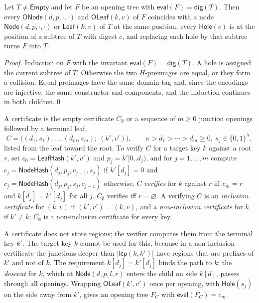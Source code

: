 \documentclass[runningheads]{llncs}
\newcommand{\LeafHash}{\mathsf{LeafHash}}
\newcommand{\NodeHash}{\mathsf{NodeHash}}
\newcommand{\dig}{\mathsf{dig}}
\newcommand{\Leaf}{\mathsf{Leaf}}
\newcommand{\Node}{\mathsf{Node}}
\newcommand{\Empty}{\mathsf{Empty}}
\newcommand{\lcp}{\mathsf{lcp}}
\newcommand{\eval}{\mathsf{eval}}
\newcommand{\Hole}{\mathsf{Hole}}
\newcommand{\OLeaf}{\mathsf{OLeaf}}
\newcommand{\ONode}{\mathsf{ONode}}
\begin{document}
\begin{lemma}[Matching]\label{lem:match}
Let $T \neq \Empty$ and let $F$ be an opening tree with $\eval(F) = \dig(T)$. Then every $\ONode(d,p,\cdot,\cdot)$ and $\OLeaf(k,v)$ of $F$ coincides with a node $\Node(d,p,\cdot,\cdot)$ or $\Leaf(k,v)$ of $T$ at the same position, every $\Hole(c)$ is at the position of a subtree of $T$ with digest $c$, and replacing each hole by that subtree turns $F$ into $T$.
\end{lemma}
\begin{proof}
Induction on $F$ with the invariant $\eval(F) = \dig(T)$. A hole is assigned the current subtree of $T$. Otherwise the two $H$-preimages are equal, or they form a collision. Equal preimages have the same domain tag and, since the encodings are injective, the same constructor and components, and the induction continues in both children.\qed
\end{proof}

\begin{definition}[Certificates]\label{def:cert}
A certificate is the empty certificate $C_\emptyset$ or a sequence of $m \ge 0$ junction openings followed by a terminal leaf,
\[
  C = \big((d_1,s_1),\ldots,(d_m,s_m);\ (k',v')\big), \qquad \kappa > d_1 > \cdots > d_m \ge 0,\ s_j \in \{0,1\}^{\lambda},
\]
listed from the leaf toward the root. To verify $C$ for a target key $k$ against a root $r$, set $c_0 = \LeafHash(k',v')$ and $p_j = k'[0..d_j)$, and for $j = 1,\ldots,m$ compute $c_j = \NodeHash(d_j,p_j,c_{j-1},s_j)$ if $k'[d_j] = 0$ and $c_j = \NodeHash(d_j,p_j,s_j,c_{j-1})$ otherwise. $C$ \emph{verifies} for $k$ against $r$ iff $c_m = r$ and $k[d_j] = k'[d_j]$ for all $j$. $C_\emptyset$ verifies iff $r = \varnothing$. A verifying $C$ is an \emph{inclusion certificate} for $(k,v)$ if $(k',v') = (k,v)$, and a \emph{non-inclusion certificate} for $k$ if $k' \neq k$; $C_\emptyset$ is a non-inclusion certificate for every key.
\end{definition}

A certificate does not store regions; the verifier computes them from the terminal key $k'$. The target key $k$ cannot be used for this, because in a non-inclusion certificate the junctions deeper than $|\lcp(k,k')|$ have regions that are prefixes of $k'$ and not of $k$. The requirement $k[d_j] = k'[d_j]$ binds the path to $k$: the \emph{descent} for $k$, which at $\Node(d,p,l,r)$ enters the child on side $k[d]$, passes through all openings. Wrapping $\OLeaf(k',v')$ once per opening, with $\Hole(s_j)$ on the side away from $k'$, gives an opening tree $F_C$ with $\eval(F_C) = c_m$.
\end{document}

